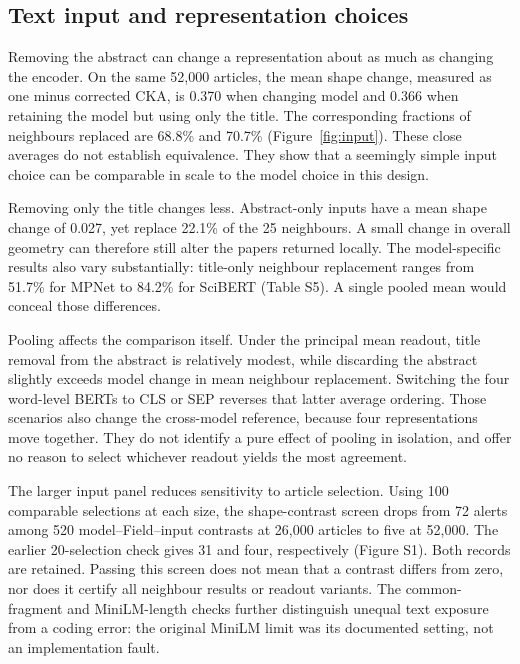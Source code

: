 \documentclass[12pt]{article}
\begin{document}
\subsection{Text input and representation choices}
Removing the abstract can change a representation about as much as changing the encoder. On the same 52,000 articles, the mean shape change, measured as one minus corrected CKA, is 0.370 when changing model and 0.366 when retaining the model but using only the title. The corresponding fractions of neighbours replaced are 68.8\% and 70.7\% (Figure~\ref{fig:input}). These close averages do not establish equivalence. They show that a seemingly simple input choice can be comparable in scale to the model choice in this design.


Removing only the title changes less. Abstract-only inputs have a mean shape change of 0.027, yet replace 22.1\% of the 25 neighbours. A small change in overall geometry can therefore still alter the papers returned locally. The model-specific results also vary substantially: title-only neighbour replacement ranges from 51.7\% for MPNet to 84.2\% for SciBERT (Table S5). A single pooled mean would conceal those differences.

Pooling affects the comparison itself. Under the principal mean readout, title removal from the abstract is relatively modest, while discarding the abstract slightly exceeds model change in mean neighbour replacement. Switching the four word-level BERTs to CLS or SEP reverses that latter average ordering. Those scenarios also change the cross-model reference, because four representations move together. They do not identify a pure effect of pooling in isolation, and offer no reason to select whichever readout yields the most agreement.

The larger input panel reduces sensitivity to article selection. Using 100 comparable selections at each size, the shape-contrast screen drops from 72 alerts among 520 model--Field--input contrasts at 26,000 articles to five at 52,000. The earlier 20-selection check gives 31 and four, respectively (Figure S1). Both records are retained. Passing this screen does not mean that a contrast differs from zero, nor does it certify all neighbour results or readout variants. The common-fragment and MiniLM-length checks further distinguish unequal text exposure from a coding error: the original MiniLM limit was its documented setting, not an implementation fault.
\end{document}
